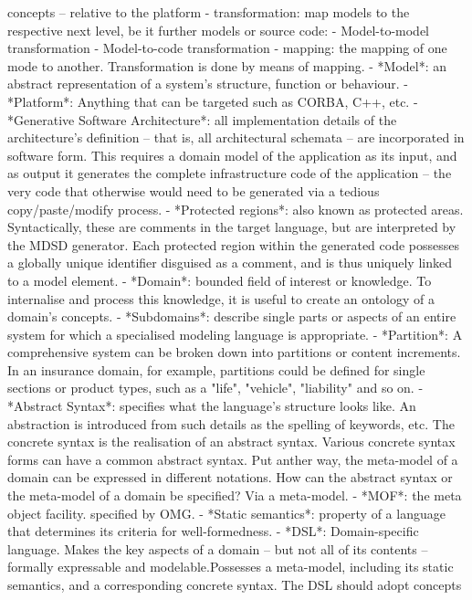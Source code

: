 \documentclass{book}
\begin{document}
  concepts – relative to the platform
- transformation: map models to the respective next level, be it
  further models or source code:
  - Model-to-model transformation
  - Model-to-code transformation
- mapping: the mapping of one mode to another. Transformation is done
  by means of mapping.
- *Model*: an abstract representation of a system’s structure,
  function or behaviour.
- *Platform*: Anything that can be targeted such as CORBA, C++, etc.
- *Generative Software Architecture*: all implementation details of
  the architecture’s definition – that is, all architectural schemata
  – are incorporated in software form. This requires a domain model of
  the application as its input, and as output it generates the
  complete infrastructure code of the application – the very code that
  otherwise would need to be generated via a tedious copy/paste/modify
  process.
- *Protected regions*: also known as protected areas. Syntactically,
  these are comments in the target language, but are interpreted by
  the MDSD generator. Each protected region within the generated code
  possesses a globally unique identifier disguised as a comment, and
  is thus uniquely linked to a model element.
- *Domain*: bounded field of interest or knowledge. To internalise and
  process this knowledge, it is useful to create an ontology of a
  domain’s concepts.
- *Subdomains*: describe single parts or aspects of an entire system
  for which a specialised modeling language is appropriate.
- *Partition*: A comprehensive system can be broken down into
  partitions or content increments. In an insurance domain, for
  example, partitions could be defined for single sections or product
  types, such as a "life", "vehicle", "liability" and so on.
- *Abstract Syntax*: specifies what the language’s structure looks
  like. An abstraction is introduced from such details as the spelling
  of keywords, etc. The concrete syntax is the realisation of an
  abstract syntax. Various concrete syntax forms can have a common
  abstract syntax. Put anther way, the meta-model of a domain can be
  expressed in different notations. How can the abstract syntax or the
  meta-model of a domain be specified? Via a meta-model.
- *MOF*: the meta object facility. specified by OMG.
- *Static semantics*: property of a language that determines its
  criteria for well-formedness.
- *DSL*: Domain-specific language. Makes the key aspects of a domain –
  but not all of its contents – formally expressable and
  modelable.Possesses a meta-model, including its static semantics,
  and a corresponding concrete syntax. The DSL should adopt concepts
\end{document}

